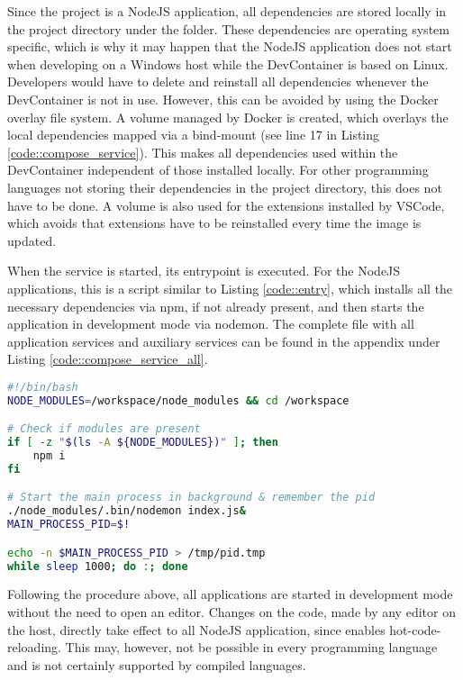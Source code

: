         Since the project is a NodeJS application, all dependencies are stored locally in the project directory under the  folder. These dependencies are operating system specific, which is why it may happen that the NodeJS application does not start when developing on a Windows host while the DevContainer is based on Linux. Developers would have to delete and reinstall all dependencies whenever the DevContainer is not in use. However, this can be avoided by using the Docker overlay file system. A volume managed by Docker is created, which overlays the local dependencies mapped via a bind-mount (see line 17 in Listing \ref{code::compose_service}). This makes all dependencies used within  the DevContainer independent of those installed locally. For other programming languages not storing their dependencies in the project directory, this does not have to be done. A volume is also used for the extensions installed by VSCode, which avoids that extensions have to be reinstalled every time the image is updated.\newline
        
        When the service is started, its entrypoint is executed. For the NodeJS applications, this is a script similar to Listing \ref{code::entry}, which installs all the necessary dependencies via npm, if not already present, and then starts the application in development mode via nodemon. The complete  file with all application services and auxiliary services can be found in the appendix under Listing \ref{code::compose_service_all}.
    \begin{lstlisting}[language=bash,caption={DevContainer \code{entryscript.sh}},breaklines=true,label={code::entry}]
#!/bin/bash
NODE_MODULES=/workspace/node_modules && cd /workspace

# Check if modules are present
if [ -z "$(ls -A ${NODE_MODULES})" ]; then
    npm i
fi

# Start the main process in background & remember the pid
./node_modules/.bin/nodemon index.js&
MAIN_PROCESS_PID=$!

echo -n $MAIN_PROCESS_PID > /tmp/pid.tmp
while sleep 1000; do :; done
        \end{lstlisting}
        Following the procedure above, all applications are started in development mode without the need to open an editor. Changes on the code, made by any editor on the host, directly take effect to all NodeJS application, since  enables hot-code-reloading. This may, however, not be possible in every programming language and is not certainly supported by compiled languages.\newline
